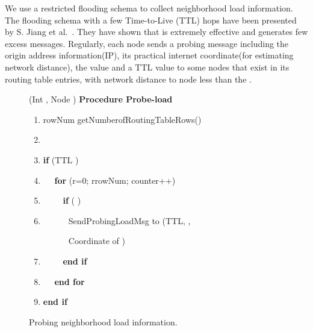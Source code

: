 \documentclass {article}
\begin{document}
We use a  restricted flooding schema to collect neighborhood load information. The flooding schema with a few Time-to-Live (TTL) hops have been presented by S. Jiang et al.~\cite{light-flood}. They have shown that is extremely effective and generates  few excess messages.
Regularly, each node  sends a probing message including the origin address information(IP), its practical internet coordinate(for estimating network distance), the  value and a  TTL value to some nodes that exist in its routing table entries, with network distance to node  less than the .
\begin{figure}
\scriptsize
{
(Int , Node )
{ \bf Procedure Probe-load}
\begin{enumerate}
\itemsep=0mm
\item {   rowNum  getNumberofRoutingTableRows() }
\item {}
\item {\bf if} {(TTL )}
\item \ \ { \bf for} (r=0; rrowNum; counter++)
\item \ \ \ \  { \bf if }( )
\item \ \ \ \ \ \ SendProbingLoadMsg to  (TTL, ,

\ \ \ \ \ \  Coordinate of )
\item \ \ \ \  { \bf end if }
\item \ \  { \bf end for}
\item  { \bf end if }
\end{enumerate}
}
\normalsize
\caption{Probing neighborhood load information. \label{ProbingLoad}}
\end{figure}
\end{document}
